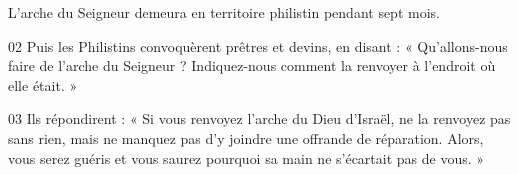 L’arche du Seigneur demeura en territoire philistin pendant sept mois.

02 Puis les Philistins convoquèrent prêtres et devins, en disant : « Qu’allons-nous faire de l’arche du Seigneur ? Indiquez-nous comment la renvoyer à l’endroit où elle était. »

03 Ils répondirent : « Si vous renvoyez l’arche du Dieu d’Israël, ne la renvoyez pas sans rien, mais ne manquez pas d’y joindre une offrande de réparation. Alors, vous serez guéris et vous saurez pourquoi sa main ne s’écartait pas de vous. »